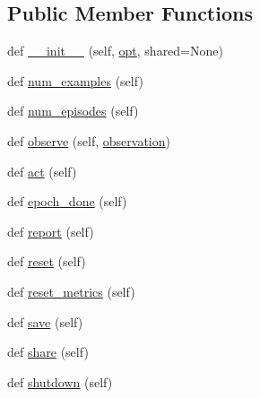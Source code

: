 \subsection*{Public Member Functions}
\begin{DoxyCompactItemize}
\item 
def \hyperlink{classparlai_1_1core_1_1agents_1_1MultiTaskTeacher_a986db56e2967759e65b3c1bdb975057d}{\+\_\+\+\_\+init\+\_\+\+\_\+} (self, \hyperlink{classparlai_1_1core_1_1agents_1_1MultiTaskTeacher_a116b724be9c512d36f1d43cb9be86b78}{opt}, shared=None)
\item 
def \hyperlink{classparlai_1_1core_1_1agents_1_1MultiTaskTeacher_a21fa6d0565bd35e54a74806ecca62e34}{num\+\_\+examples} (self)
\item 
def \hyperlink{classparlai_1_1core_1_1agents_1_1MultiTaskTeacher_ac292d1cb86a3769c352e2d3658f324d2}{num\+\_\+episodes} (self)
\item 
def \hyperlink{classparlai_1_1core_1_1agents_1_1MultiTaskTeacher_a42290221cabd0f1ca21cb87a2228af10}{observe} (self, \hyperlink{classparlai_1_1core_1_1agents_1_1Agent_aedbecc4b4aa7af7413882a0429e0f1db}{observation})
\item 
def \hyperlink{classparlai_1_1core_1_1agents_1_1MultiTaskTeacher_a29a2c8f7679aafd2d67b4b0db54d58a3}{act} (self)
\item 
def \hyperlink{classparlai_1_1core_1_1agents_1_1MultiTaskTeacher_a17444e342ab19c23cee28bba08a64df9}{epoch\+\_\+done} (self)
\item 
def \hyperlink{classparlai_1_1core_1_1agents_1_1MultiTaskTeacher_ac93a499c6438ee1b57d0ad6a702851ae}{report} (self)
\item 
def \hyperlink{classparlai_1_1core_1_1agents_1_1MultiTaskTeacher_ae4eeda38c4164498018ee6515050ae43}{reset} (self)
\item 
def \hyperlink{classparlai_1_1core_1_1agents_1_1MultiTaskTeacher_a78eb3c163a158deda3bb6bd9000fcee2}{reset\+\_\+metrics} (self)
\item 
def \hyperlink{classparlai_1_1core_1_1agents_1_1MultiTaskTeacher_abb082dd4c5be92b7ce7683b16d0abd2c}{save} (self)
\item 
def \hyperlink{classparlai_1_1core_1_1agents_1_1MultiTaskTeacher_adbd1854cad9eb58ba1c7736b44bf5e96}{share} (self)
\item 
def \hyperlink{classparlai_1_1core_1_1agents_1_1MultiTaskTeacher_a259dd3bec3f24669e835d8fbac657c3b}{shutdown} (self)
\end{DoxyCompactItemize}
